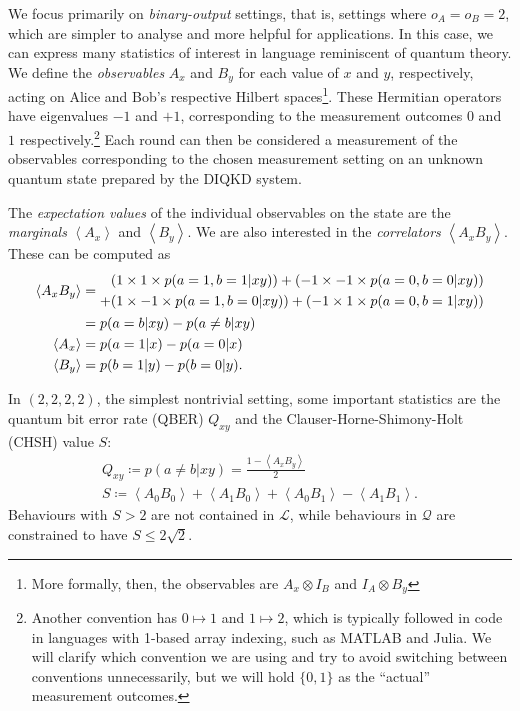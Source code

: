 \documentclass[10pt, a4paper]{article}
\newcommand{\?}{\mathrel{?}} %
\newcommand{\angleb}[1]{\left\langle #1 \right\rangle} %
\numberwithin{equation}{section} %
\theoremstyle{definition}
\theoremstyle{plain}
\theoremstyle{plain}
\newcommand{\Ls}{\mathcal{L}}
\newcommand{\Qs}{\mathcal{Q}}
\begin{document}
  We focus primarily on \emph{binary-output} settings, that is, settings where \(o_A = o_B = 2\), which are simpler to analyse and more helpful for applications. In this case, we can express many statistics of interest in language reminiscent of quantum theory. We define the \emph{observables} \(A_x\) and \(B_y\) for each value of \(x\) and \(y\), respectively, acting on Alice and Bob's respective Hilbert spaces\footnote{More formally, then, the observables are \(A_x \otimes I_B\) and \(I_A \otimes B_y\)}. These Hermitian operators have eigenvalues \(-1\) and \(+1\), corresponding to the measurement outcomes \(0\) and \(1\) respectively.\footnote{Another convention has \(0 \mapsto 1\) and \(1 \mapsto 2\), which is typically followed in code in languages with 1-based array indexing, such as MATLAB and Julia. We will clarify which convention we are using and try to avoid switching between conventions unnecessarily, but we will hold \(\{0,1\}\) as the ``actual'' measurement outcomes.} Each round can then be considered a measurement of the observables corresponding to the chosen measurement setting on an unknown quantum state prepared by the DIQKD system.

  The \emph{expectation values} of the individual observables on the state are the \emph{marginals} \(\angleb{A_x}\) and \(\angleb{B_y}\). We are also interested in the \emph{correlators} \(\angleb{A_x B_y}\). These can be computed as
  \begin{align}
    \angleb{A_x B_y} &= \begin{aligned}[c]
      (1 \times 1 \times p(a=1,b=1|xy)) + (-1 \times -1 \times p(a=0,b=0|xy)) \\
      + (1 \times -1 \times p(a=1,b=0|xy)) + (-1 \times 1 \times p(a=0,b=1|xy))
    \end{aligned} \notag \\
                     &= p(a=b|xy) - p(a\neq b|xy) \\
      \angleb{A_x} &= p(a=1|x) - p(a=0|x) \\
      \angleb{B_y} &= p(b=1|y) - p(b=0|y).
  \end{align}

  In \((2,2,2,2)\), the simplest nontrivial setting, some important statistics are the quantum bit error rate (QBER) \(Q_{xy}\) and the Clauser-Horne-Shimony-Holt (CHSH) value \(S\):
  \begin{gather}
    Q_{xy} \coloneqq p(a \neq b|xy) = \frac{1-\angleb{A_x B_y}}{2} \\
    S \coloneqq \angleb{A_0 B_0} + \angleb{A_1 B_0} + \angleb{A_0 B_1} - \angleb{A_1 B_1}.
  \end{gather}
  Behaviours with \(S > 2\) are not contained in \(\Ls\), while behaviours in \(\Qs\) are constrained to have \(S \leq 2\sqrt{2}\).
\end{document}
